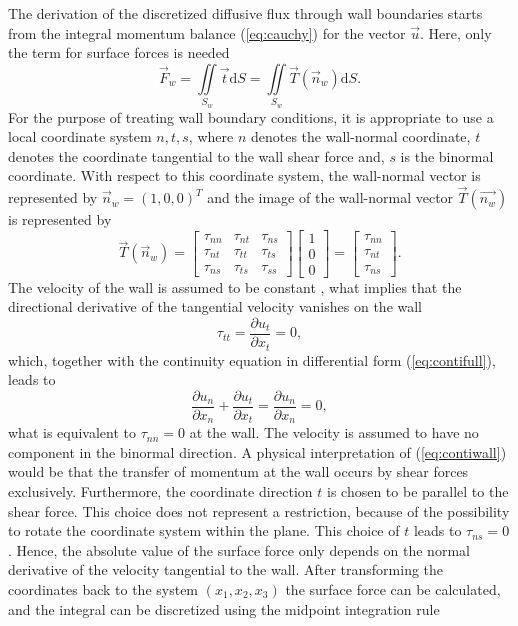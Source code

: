 The derivation of the discretized diffusive flux through wall boundaries starts from the integral momentum balance (\ref{eq:cauchy}) for the vector \(\vec{u}\). Here, only the term for surface forces is needed
\begin{displaymath}
  \vec{F}_w =  \iint\limits_{S_w} \vec{t} \mathrm{d}S = \iint\limits_{S_w} \vec{T}(\vec{n}_w) \mathrm{d}S.
\end{displaymath}
For the purpose of treating wall boundary conditions, it is appropriate to use a local coordinate system \(n,t,s\), where \(n\) denotes the wall-normal coordinate, \(t\) denotes the coordinate tangential to the wall shear force and, \(s\) is the binormal coordinate. With respect to this coordinate system, the wall-normal vector is represented by \(\vec{n}_w = \left( 1, 0 , 0 \right)^T\) and the image of the wall-normal vector \(\vec{T}(\vec{n_w})\) is represented by 
\begin{displaymath}
\vec{T}(\vec{n}_w) =
\left[
  \begin{array}{ccc}
    \tau_{nn} & \tau_{nt} & \tau_{ns}\\
    \tau_{nt} & \tau_{tt} & \tau_{ts}\\
    \tau_{ns} & \tau_{ts} & \tau_{ss}
  \end{array}
\right]
\left[
\begin{array}{c}
  1\\
  0\\
  0
\end{array}
\right]
=
\left[
\begin{array}{c}
  \tau_{nn}\\
  \tau_{nt}\\
  \tau_{ns}
\end{array}
\right].
\end{displaymath}
The velocity of the wall is assumed to be constant \cite{schaefer99}, what implies that the directional derivative of the tangential velocity vanishes on the wall
\begin{displaymath}
  \tau_{tt} =  \frac{ \partial u_t }{ \partial x_t }  =  0,
\end{displaymath}
which, together with the continuity equation in differential form (\ref{eq:contifull}), leads to
\begin{equation}
  \label{eq:contiwall}
 \frac{ \partial u_n }{ \partial x_n } + \frac{ \partial u_t }{ \partial x_t } =  \frac{ \partial u_n }{ \partial x_n } = 0,
\end{equation}
what is equivalent to \( \tau_{nn} = 0\) at the wall. The velocity is assumed to have no component in the binormal direction. A physical interpretation of (\ref{eq:contiwall}) would be that the transfer of momentum at the wall occurs by shear forces exclusively. Furthermore, the coordinate direction \(t\) is chosen to be parallel to the shear force.  This choice does not represent a restriction, because of the possibility to rotate the coordinate system within the plane. This choice of \(t\) leads to \( \tau_{ns} = 0 \). Hence, the absolute value of the surface force only depends on the normal derivative of the velocity tangential to the wall. After transforming the coordinates back to the system \((x_1, x_2, x_3)\) the surface force can be calculated, and the integral can be discretized using the midpoint integration rule 
